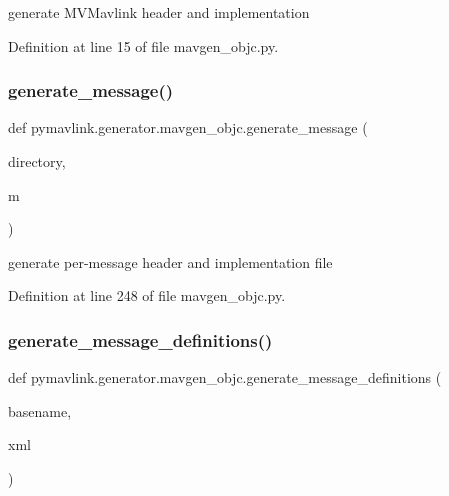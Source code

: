 \begin{DoxyVerb}generate MVMavlink header and implementation\end{DoxyVerb}
 

Definition at line 15 of file mavgen\+\_\+objc.\+py.

\mbox{\label{namespacepymavlink_1_1generator_1_1mavgen__objc_ab9050e3458fe8e9f6cc2210a66bd2b83}} 
\subsubsection{\texorpdfstring{generate\_message()}{generate\_message()}}
{\footnotesize\ttfamily def pymavlink.\+generator.\+mavgen\+\_\+objc.\+generate\+\_\+message (\begin{DoxyParamCaption}\item[{}]{directory,  }\item[{}]{m }\end{DoxyParamCaption})}

\begin{DoxyVerb}generate per-message header and implementation file\end{DoxyVerb}
 

Definition at line 248 of file mavgen\+\_\+objc.\+py.

\mbox{\label{namespacepymavlink_1_1generator_1_1mavgen__objc_a0976eb9b9b1af74699e2a1ecf5fef706}} 
\subsubsection{\texorpdfstring{generate\_message\_definitions()}{generate\_message\_definitions()}}
{\footnotesize\ttfamily def pymavlink.\+generator.\+mavgen\+\_\+objc.\+generate\+\_\+message\+\_\+definitions (\begin{DoxyParamCaption}\item[{}]{basename,  }\item[{}]{xml }\end{DoxyParamCaption})}

